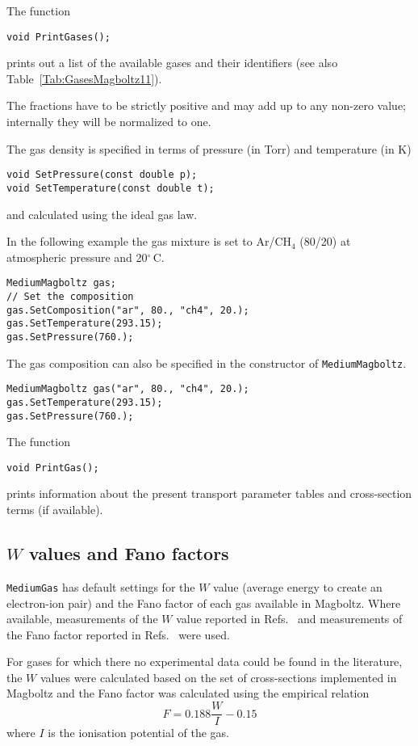 The function
\begin{lstlisting}
void PrintGases();
\end{lstlisting}
prints out a list of the available gases and their identifiers 
(see also Table~\ref{Tab:GasesMagboltz11}).
 
The fractions have to be strictly positive and 
may add up to any non-zero value; 
internally they will be normalized to one.

The gas density is specified in terms of pressure (in Torr) 
and temperature (in K)
\begin{lstlisting}
void SetPressure(const double p);
void SetTemperature(const double t);
\end{lstlisting}
and calculated using the ideal gas law. 

In the following example the gas mixture is set 
to Ar/CH\(_{4}\) (80/20) at 
atmospheric pressure and 20\(^{\circ}\)\,C.
\begin{lstlisting}
MediumMagboltz gas;
// Set the composition
gas.SetComposition("ar", 80., "ch4", 20.);
gas.SetTemperature(293.15);
gas.SetPressure(760.);
\end{lstlisting}
The gas composition can also be specified in the constructor of 
\texttt{MediumMagboltz}.
\begin{lstlisting}
MediumMagboltz gas("ar", 80., "ch4", 20.);
gas.SetTemperature(293.15);
gas.SetPressure(760.);
\end{lstlisting}

The function
\begin{lstlisting}
void PrintGas();
\end{lstlisting}
prints information about the present transport parameter tables and 
cross-section terms (if available). 

\subsection{$W$ values and Fano factors}
\texttt{MediumGas} has default settings for the 
$W$ value (average energy to create an electron-ion pair) and 
the Fano factor of each gas available in Magboltz.
Where available, measurements of the $W$ value reported in 
Refs.~\cite{ICRU31,Reinking1986,Pansky1997} and measurements of the Fano factor 
reported in Refs.~\cite{IAEA799,Srdoc1987,Pansky1997} were used. 

For gases for which there no experimental data could be found 
in the literature, the $W$ values were calculated based on the set of 
cross-sections implemented in Magboltz and the Fano factor was calculated 
using the empirical relation \cite{KrajcarBronic1992}
\begin{equation*}
F = 0.188 \frac{W}{I} - 0.15
\end{equation*}
where $I$ is the ionisation potential of the gas.

